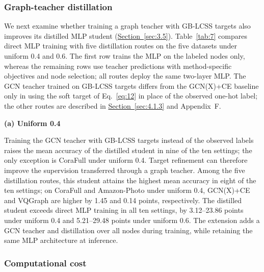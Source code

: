 \documentclass[a4paper,fleqn]{cas-sc}
\theoremstyle{definition}
\theoremstyle{plain}
\begin{document}
\subsubsection{Graph-teacher distillation}\label{sec:4.4.1}

We next examine whether training a graph teacher with GB-LCSS targets also improves its distilled MLP student (\hyperref[sec:3.5]{Section~\ref*{sec:3.5}}). Table~\ref{tab:7} compares direct MLP training with five distillation routes on the five datasets under uniform 0.4 and 0.6. The first row trains the MLP on the labeled nodes only, whereas the remaining rows use teacher predictions with method-specific objectives and node selection; all routes deploy the same two-layer MLP. The GCN teacher trained on GB-LCSS targets differs from the GCN(X)+CE baseline only in using the soft target of Eq.~\eqref{eq:12} in place of the observed one-hot label; the other routes are described in \hyperref[sec:4.1.3]{Section~\ref*{sec:4.1.3}} and Appendix~F.

\begin{table}
\centering
\caption{Test accuracy of deployed MLPs under direct training and graph-to-MLP distillation.}\label{tab:7}
{\small\textbf{(a) Uniform 0.4}}\par\smallskip



\par{}\par\smallskip



\end{table}

Training the GCN teacher with GB-LCSS targets instead of the observed labels raises the mean accuracy of the distilled student in nine of the ten settings; the only exception is CoraFull under uniform 0.4. Target refinement can therefore improve the supervision transferred through a graph teacher. Among the five distillation routes, this student attains the highest mean accuracy in eight of the ten settings; on CoraFull and Amazon-Photo under uniform 0.4, GCN(X)+CE and VQGraph are higher by 1.45 and 0.14 points, respectively. The distilled student exceeds direct MLP training in all ten settings, by 3.12--23.86 points under uniform 0.4 and 5.21--29.48 points under uniform 0.6. The extension adds a GCN teacher and distillation over all nodes during training, while retaining the same MLP architecture at inference.
\subsubsection{Computational cost}\label{sec:4.4.2}
\end{document}
